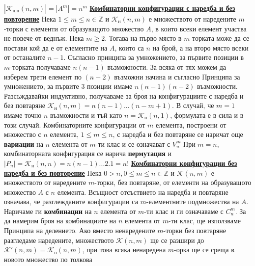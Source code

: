 \documentclass{article}
\begin{document}
$|\mathcal{K}_{\text{н,п}}(n, m)| = |A^m| = n^m$ \newline\newline
\textbf{\underline{Комбинаторни конфигурации с наредба и без повторение}} \newline\newline
Нека $1 \le m \le n \in \mathbb{Z}$ и $\mathcal{K}_{\text{н}}(n, m)$ е множеството от наредените $m$-торки с елементи от образуващото
множество $A$, в които всеки елемент участва не повече от веднъж. Нека $m \ge 2$. Тогава на първо място в $m$-торката може да се
постави кой да е от елементите на $A$, които са $n$ на брой, а на второ място всеки от останалите $n - 1$. Съгласно принципа за
умножението, за първите позиции в $m$-торката получаваме $n(n - 1)$ възможности. За всяка от тях можем да изберем трети елемент
по $(n - 2)$ възможни начина и съгласно Принципа за умножението, за първите 3 позиции имаме $n(n - 1)(n - 2)$ възможности.
Разсъждавайки индуктивно, получаваме за броя на конфигурациите с наредба и без повтаряне $\mathcal{K}_{\text{н}}(n, m) = n(n - 1)
...(n - m + 1)$. В случай, че $m = 1$ имаме точно $n$ възможности и тъй като $n = \mathcal{K}_{\text{н}}(n, 1)$, формулата е в
сила и в този случай. \newline
Комбинаторните конфигурации от $m$ елемента, построени от множество с $n$ елемента, $1 \le m \le n$, с наредба и без повтаряне
се наричат още \textbf{вариации} на $n$ елемента от $m$-ти клас и се означават с $V_n^m$\newline
При $m = n$, комбинаторната конфигурация се нарича \textbf{пермутация} и $|P_n| = \mathcal{K}_{\text{н}}(n, n) = n(n - 1)...2.1
= n!$ \newline\newline
\textbf{\underline{Комбинаторни конфигурации без наредба и без повторение}} \newline\newline
Нека $0 > n, 0 \le m \le n \in \mathbb{Z}$ и $\mathcal{K}(n, m)$ е множеството от наредените $m$-торки, без повтаряне, от елементи
на образуващото множество $A$ с $n$ елемента. Всъщност отсъствието на наредба и повтаряне означава, че разглежданите
конфигурации са $m$-елементните подмножества на $A$. Наричаме ги \textbf{комбинации} на $n$ елемента от $m$-ти клас и ги
означаваме с $C_n^m$. За да намерим броя на комбинациите на $n$ елемента от $m$-ти клас, ще използваме Принципа на делението.
Ако вместо ненаредените $m$-торки без повтаряне разгледаме наредените, множеството $\mathcal{K}(n, m)$ ще се разшири до
$\mathcal{K'}(n, m) = \mathcal{K_{\text{н}}}(n, m)$, при това всяка ненаредена $m$-орка ще се среща в новото множество по толкова
\end{document}
